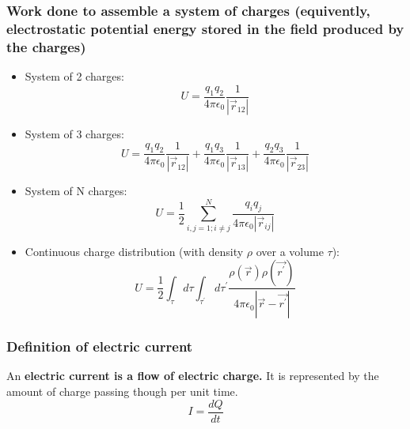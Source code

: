 \documentclass[english,11pt]{article}
\begin{document}
\subsubsection*{\bf Work done to assemble a system of charges
  (equivently, electrostatic potential energy stored in the field produced by the charges)}

          \begin{itemize}
          \item System of 2 charges:
           \begin{equation*}
                U = \frac{q_1 q_2}{4\pi\epsilon_0} \frac{1}{|\vec{r}_{12}|}
           \end{equation*}

          \item System of 3 charges:
           \begin{equation*}
             U = \frac{q_1 q_2}{4\pi\epsilon_0} \frac{1}{|\vec{r}_{12}|} +
                 \frac{q_1 q_3}{4\pi\epsilon_0} \frac{1}{|\vec{r}_{13}|} +
                 \frac{q_2 q_3}{4\pi\epsilon_0} \frac{1}{|\vec{r}_{23}|}
           \end{equation*}

          \item System of N charges:
           \begin{equation*}
             U = \frac{1}{2} \sum_{i,j=1;i{\ne}j}^{N} \frac{q_i q_j}{4\pi\epsilon_0|\vec{r}_{ij}|}
           \end{equation*}

          \item Continuous charge distribution (with density $\rho$ over a volume $\tau$):
           \begin{equation*}
              U = \frac{1}{2} \int_{\tau} d\tau \int_{\tau^{\prime}} d\tau^{\prime}
                  \frac{\rho(\vec{r}) \rho(\vec{r^{\prime}})}{4\pi\epsilon_0|\vec{r} - \vec{r^{\prime}}|}
           \end{equation*}

          \end{itemize}

\subsubsection*{\bf Definition of electric current}

An {\bf electric current is a flow of electric charge.}
It is represented by the amount of charge passing though per unit time.
\begin{equation*}
  I = \frac{dQ}{dt}
\end{equation*}
\end{document}
